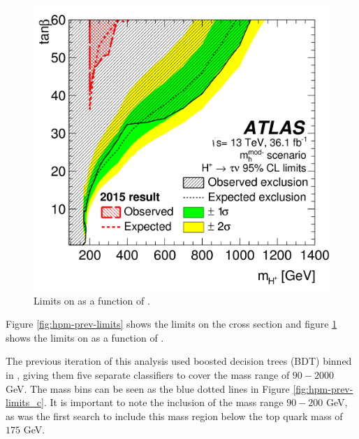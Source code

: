 		\begin{figure}[!h]
			\centering
			\includegraphics[width=0.75\linewidth]{chapters/chapter1_theory/images/Previous_Limits_Combined_tanb.png}
			\caption{\label{fig:hpm-prev-limits-tanb} Limits on \tanb as a function of \mHpm. \cite{hpm-previous} }
		\end{figure}
		Figure \ref{fig:hpm-prev-limits} shows the limits on the cross section and figure \ref{fig:hpm-prev-limits-tanb} shows the limits on \tanb as a function of \mHpm. 

		The previous iteration of this analysis used boosted decision trees (BDT) binned in \mHpm, giving them five separate classifiers to cover the mass range of $90 - 2000$ GeV. The mass bins can be seen as the blue dotted lines in Figure \ref{fig:hpm-prev-limits_c}. It is important to note the inclusion of the mass range $90 - 200$ GeV, as \cite{hpm-previous} was the first search to include this mass region below the top quark mass of $175$ GeV.